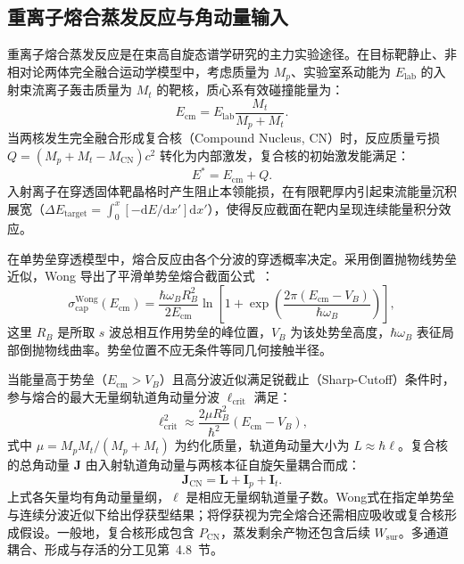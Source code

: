 \subsection{重离子熔合蒸发反应与角动量输入}\label{subsec:5-1-2}

重离子熔合蒸发反应是在束高自旋态谱学研究的主力实验途径。在目标靶静止、非相对论两体完全融合运动学模型中，考虑质量为 $M_p$、实验室系动能为 $E_{\mathrm{lab}}$ 的入射束流离子轰击质量为 $M_t$ 的靶核，质心系有效碰撞能量为：
\begin{equation}\label{eq:5-1-ecm}
E_{\mathrm{cm}} = E_{\mathrm{lab}} \frac{M_t}{M_p + M_t}.
\end{equation}
当两核发生完全融合形成复合核（Compound Nucleus, CN）时，反应质量亏损 $Q = (M_p + M_t - M_{\mathrm{CN}})c^2$ 转化为内部激发，复合核的初始激发能满足：
\begin{equation}\label{eq:5-1-estar}
E^* = E_{\mathrm{cm}} + Q.
\end{equation}
入射离子在穿透固体靶晶格时产生阻止本领能损，在有限靶厚内引起束流能量沉积展宽（$\Delta E_{\mathrm{target}} = \int_0^x [-\mathrm{d}E/\mathrm{d}x']\mathrm{d}x'$），使得反应截面在靶内呈现连续能量积分效应。

在单势垒穿透模型中，熔合反应由各个分波的穿透概率决定。采用倒置抛物线势垒近似，Wong 导出了平滑单势垒熔合截面公式~\cite{book-bertulani-nuclear-reactions, book-lin-heavy-ion-reactions}：
\begin{equation}\label{eq:5-1-wong}
\sigma_{\mathrm{cap}}^{\mathrm{Wong}}(E_{\mathrm{cm}}) = \frac{\hbar\omega_B R_B^2}{2E_{\mathrm{cm}}}\ln\left[1+\exp\left(\frac{2\pi(E_{\mathrm{cm}}-V_B)}{\hbar\omega_B}\right)\right],
\end{equation}
这里 $R_B$ 是所取 $s$ 波总相互作用势垒的峰位置，$V_B$ 为该处势垒高度，$\hbar\omega_B$ 表征局部倒抛物线曲率。势垒位置不应无条件等同几何接触半径。

当能量高于势垒（$E_{\mathrm{cm}} > V_B$）且高分波近似满足锐截止（Sharp-Cutoff）条件时，参与熔合的最大无量纲轨道角动量分波 $\ell_{\mathrm{crit}}$ 满足：
\begin{equation}\label{eq:5-1-lcrit}
\ell_{\mathrm{crit}}^2 \approx \frac{2\mu R_B^2}{\hbar^2}(E_{\mathrm{cm}} - V_B),
\end{equation}
式中 $\mu = M_p M_t / (M_p + M_t)$ 为约化质量，轨道角动量大小为 $L \approx \hbar \ell$。复合核的总角动量 $\mathbf{J}$ 由入射轨道角动量与两核本征自旋矢量耦合而成：
\begin{equation}\label{eq:5-1-j-coupling}
\mathbf J_{\mathrm{CN}}=\mathbf L+\mathbf I_p+\mathbf I_t.
\end{equation}
上式各矢量均有角动量量纲，$\ell$ 是相应无量纲轨道量子数。Wong式在指定单势垒与连续分波近似下给出俘获型结果；将俘获视为完全熔合还需相应吸收或复合核形成假设。一般地，复合核形成包含 $P_{\mathrm{CN}}$，蒸发剩余产物还包含后续 $W_{\mathrm{sur}}$。多通道耦合、形成与存活的分工见第~4.8~节。

